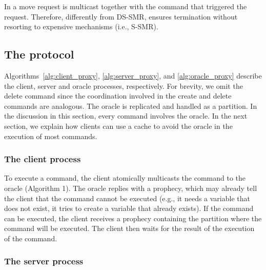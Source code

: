 In \dynastar a move request is multicast together with the command that triggered the request.
Therefore, differently from DS-SMR, \dynastar ensures termination without resorting to expensive mechanisms (i.e., S-SMR).


\subsection{The \dynastar protocol}

Algorithms~\ref{alg:client_proxy}, \ref{alg:server_proxy}, and \ref{alg:oracle_proxy} describe the client, server and oracle processes, respectively. 
For brevity, we omit the delete command since the coordination involved in the create and delete commands are analogous. 
The oracle is replicated and handled as a partition.
In the discussion in this section, every command involves the oracle.
In the next section, we explain how clients can use a cache to avoid the oracle in the execution of most commands.




\subsubsection{The client process} 

To execute a command, the client atomically multicasts the command to the oracle (Algorithm 1).
The oracle replies with a prophecy, which may already tell the client that the command cannot be executed (e.g., it needs a variable that does not exist, it tries to create a variable that already exists).
If the command can be executed, the client receives a prophecy containing the partition where the command will be executed. The client then waits for the result of the execution of the command.



\subsubsection{The server process} 

